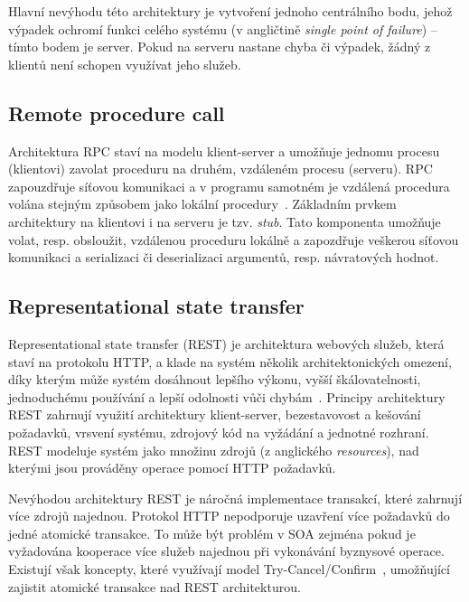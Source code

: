 Hlavní nevýhodu této architektury je vytvoření jednoho centrálního bodu,
jehož výpadek ochromí funkci celého systému (v angličtině
\textit{single point of failure}) -- tímto bodem je server.
Pokud na serveru nastane chyba či výpadek, žádný z klientů není schopen využívat
jeho služeb.

\subsection{Remote procedure call}\label{sec:rpc}

Architektura \gls{RPC} staví na modelu klient-server a umožňuje jednomu procesu (klientovi)
zavolat proceduru na druhém, vzdáleném procesu (serveru).
\gls{RPC} zapouzdřuje síťovou komunikaci a v programu samotném
je vzdálená procedura volána stejným způsobem jako lokální procedury~\cite{nelson1981remote}. Základním
prvkem architektury na klientovi i na serveru je tzv. \textit{stub}. Tato komponenta
umožňuje volat, resp. obsloužit, vzdálenou proceduru lokálně a zapozdřuje veškerou
síťovou komunikaci a serializaci či deserializaci argumentů, resp. návratových hodnot.

\subsection{Representational state transfer}\label{sec:rest}

Representational state transfer (\gls{REST}) je architektura
webových služeb, která staví na protokolu \gls{HTTP}, a klade na systém
několik architektonických omezení, díky kterým může systém dosáhnout
lepšího výkonu, vyšší škálovatelnosti, jednoduchému používání
a lepší odolnosti vůči chybám~\cite{fielding2000rest}. Principy architektury
\gls{REST} zahrnují využití architektury klient-server, bezestavovost a kešování požadavků,
vrsvení systému, zdrojový kód na vyžádání a jednotné rozhraní.
\gls{REST} modeluje systém jako množinu zdrojů (z anglického \textit{resources}),
nad kterými jsou prováděny operace pomocí \gls{HTTP} požadavků.

Nevýhodou architektury \gls{REST} je náročná implementace transakcí, které zahrnují více
zdrojů najednou. Protokol \gls{HTTP} nepodporuje uzavření více požadavků do jedné atomické
transakce. To může být problém v \gls{SOA} zejména pokud je vyžadována kooperace více služeb
najednou při vykonávání byznysové operace. Existují však koncepty, které využívají model
Try-Cancel/Confirm~\cite{pardon2011towards}, umožňující zajistit atomické transakce nad
\gls{REST} architekturou.

